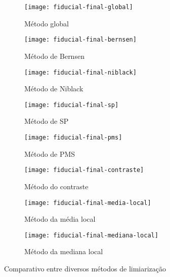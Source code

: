 \documentclass[brazilian,a4paper,twocolumn]{article}
\begin{document}
        \begin{figure}[H]
            \centering
            \begin{subfigure}{0.23\textwidth}
                \texttt{[image: fiducial-final-global]}
                \caption{Método global}
                \label{fig:fiducial-global}
            \end{subfigure}
            \begin{subfigure}{0.23\textwidth}
                \texttt{[image: fiducial-final-bernsen]}
                \caption{Método de Bernsen}
                \label{fig:fiducial-bernsen}
            \end{subfigure}
            \begin{subfigure}{0.23\textwidth}
                \texttt{[image: fiducial-final-niblack]}
                \caption{Método de Niblack}
                \label{fig:fiducial-niblack}
            \end{subfigure}
            \begin{subfigure}{0.23\textwidth}
                \texttt{[image: fiducial-final-sp]}
                \caption{Método de SP}
                \label{fig:fiducial-sp}
            \end{subfigure}
            \begin{subfigure}{0.23\textwidth}
                \texttt{[image: fiducial-final-pms]}
                \caption{Método de PMS}
                \label{fig:fiducial-pms}
            \end{subfigure}
            \begin{subfigure}{0.23\textwidth}
                \texttt{[image: fiducial-final-contraste]}
                \caption{Método do contraste}
                \label{fig:fiducial-contraste}
            \end{subfigure}
            \begin{subfigure}{0.23\textwidth}
                \texttt{[image: fiducial-final-media-local]}
                \caption{Método da média local}
                \label{fig:fiducial-media}
            \end{subfigure}
            \begin{subfigure}{0.23\textwidth}
                \texttt{[image: fiducial-final-mediana-local]}
                \caption{Método da mediana local}
                \label{fig:fiducial-mediana}
            \end{subfigure}

            \caption{Comparativo entre diversos métodos de limiarização}
            \label{fig:fiducial-limiarizacao}
        \end{figure}
\end{document}
